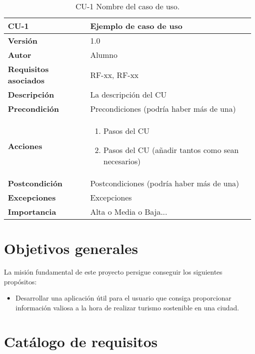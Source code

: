 \begin{table}[p]
	\centering
	\begin{tabularx}{\linewidth}{ p{} p{} }
		\toprule
		\textbf{CU-1}    & \textbf{Ejemplo de caso de uso}\\
		\toprule
		\textbf{Versión}              & 1.0    \\
		\textbf{Autor}                & Alumno \\
		\textbf{Requisitos asociados} & RF-xx, RF-xx \\
		\textbf{Descripción}          & La descripción del CU \\
		\textbf{Precondición}         & Precondiciones (podría haber más de una) \\
		\textbf{Acciones}             &
		\begin{enumerate}
			\def\labelenumi{\arabic{enumi}.}
			\tightlist
			\item Pasos del CU
			\item Pasos del CU (añadir tantos como sean necesarios)
		\end{enumerate}\\
		\textbf{Postcondición}        & Postcondiciones (podría haber más de una) \\
		\textbf{Excepciones}          & Excepciones \\
		\textbf{Importancia}          & Alta o Media o Baja... \\
		\bottomrule
	\end{tabularx}
	\caption{CU-1 Nombre del caso de uso.}
\end{table}

\section{Objetivos generales}
La misión fundamental de este proyecto persigue conseguir los siguientes propósitos:
\begin{itemize}
	\item Desarrollar una aplicación útil para el usuario que consiga proporcionar información valiosa a la hora de realizar turismo sostenible en una ciudad.
	\
\end{itemize}
\section{Catálogo de requisitos}

